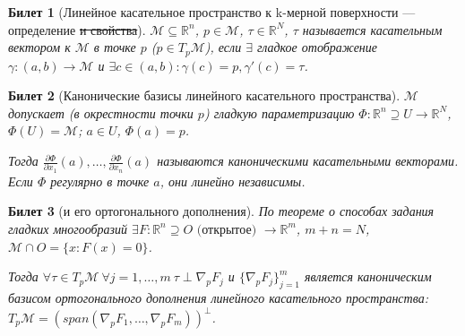 \documentclass[11pt,a4paper,oneside]{scrartcl}
\newcommand{\R}{\mathbb{R}}
\newcommand{\M}{\mathcal{M}}
\newtheorem{ticket}{Билет}
\begin{document}
\setcounter{ticket}{20}
\addtocounter{ticket}{-1}
\begin{ticket}[Линейное касательное пространство к k-мерной поверхности — определение \sout{и свойства}]
    $\M \subseteq \R^n$, $p \in \M$, $\tau \in \R^N$, $\tau$ называется
    касательным вектором к $\M$ в точке $p$ ($p \in T_p \M$),
    если $\exists$ гладкое отображение $\gamma: (a, b) \rightarrow \M$
    и $\exists c \in (a, b): \gamma(c) = p, \gamma'(c) = \tau$.
\end{ticket}

\addtocounter{ticket}{-1}
\begin{ticket}[Канонические базисы линейного касательного пространства]
    $\M$ допускает (в окрестности точки $p$) гладкую параметризацию
    $\Phi: \R^n \supseteq U \rightarrow \R^N$, $\Phi(U) = \M$;
    $a \in U$, $\Phi(a) = p$.

    Тогда $\frac{\partial \Phi}{\partial x_1}(a), \dots,
        \frac{\partial \Phi}{\partial x_n}(a)$
    называются каноническими касательными векторами.
    Если $\Phi$ регулярно в точке $a$, они линейно независимы.

%
\end{ticket}

\addtocounter{ticket}{-1}
\begin{ticket}[и его ортогонального дополнения]
    По теореме о способах задания гладких многообразий %
    $\exists F: \R^n \supseteq O \text{ (открытое) } \rightarrow \R^m$, $m + n = N$,
    $\M \cap O = \{x: F(x) = 0\}$.

    Тогда $\forall \tau \in T_p \M \ \forall j=1, \dots, m \ \tau \perp \nabla_p F_j$
    и $\{\nabla_p F_j\}_{j=1}^m$ является каноническим базисом ортогонального
    дополнения линейного касательного пространства:
    $T_p \M = (span(\nabla_p F_1, \dots, \nabla_p F_m))^\perp$.
\end{ticket}
\end{document}
